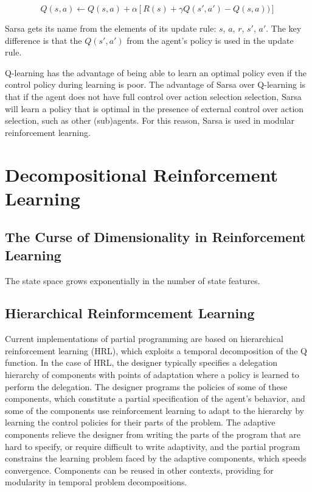 \begin{equation}
Q(s, a) \leftarrow Q(s, a) + \alpha [R(s) + \gamma Q(s', a') - Q(s, a))]
\end{equation}

Sarsa gets its name from the elements of its update rule: $s$, $a$, $r$, $s'$, $a'$. The key difference is that the $Q(s', a')$ from the agent's policy is used in the update rule.

Q-learning has the advantage of being able to learn an optimal policy even if the control policy during learning is poor. The advantage of Sarsa over Q-learning is that if the agent does not have full control over action selection selection, Sarsa will learn a policy that is optimal in the presence of external control over action selection, such as other (sub)agents. For this reason, Sarsa is used in modular reinforcement learning.

\section{Decompositional Reinforcement Learning}

\subsection{The Curse of Dimensionality in Reinforcement Learning}

The state space grows exponentially in the number of state features.





\subsection{Hierarchical Reinformcement Learning}

Current implementations of partial programming are based on hierarchical reinforcement learning (HRL), which exploits a temporal decomposition of the Q function.  In the case of HRL, the designer typically specifies a delegation hierarchy of components with points of adaptation where a policy is learned to perform the delegation.  The designer programs the policies of some of these components, which constitute a partial specification of the agent's behavior, and some of the components use reinforcement learning to adapt to the hierarchy by learning the control policies for their parts of the problem.  The adaptive components relieve the designer from writing the parts of the program that are hard to specify, or require difficult to write adaptivity, and the partial program constrains the learning problem faced by the adaptive components, which speeds convergence.  Components can be reused in other contexts, providing for modularity in temporal problem decompositions.

